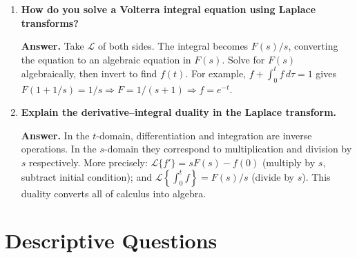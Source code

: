 \documentclass[12pt,a4paper]{article}
\begin{document}
\begin{enumerate}[label=\textbf{Q\arabic*.}, leftmargin=*, itemsep=8pt]
  \textbf{Answer.}
  $\mathcal{L}\!\left\{\int_0^t\!\int_0^{t_1}\!\cdots\!\int_0^{t_{n-1}} f(t_n)\,dt_n\cdots\,dt_1\right\}
  = F(s)/s^n$.
  Derived by applying the single-integral formula $n$ times. At each step the denominator
  gains one more factor of $s$.

\item \textbf{How do you solve a Volterra integral equation using Laplace transforms?}

  \textbf{Answer.} Take $\mathcal{L}$ of both sides. The integral becomes $F(s)/s$,
  converting the equation to an algebraic equation in $F(s)$. Solve for $F(s)$ algebraically,
  then invert to find $f(t)$. For example, $f + \int_0^t f\,d\tau = 1$ gives
  $F(1 + 1/s) = 1/s \Rightarrow F = 1/(s+1) \Rightarrow f = e^{-t}$.

\item \textbf{Explain the derivative--integral duality in the Laplace transform.}

  \textbf{Answer.} In the $t$-domain, differentiation and integration are inverse
  operations. In the $s$-domain they correspond to multiplication and division by $s$
  respectively. More precisely: $\mathcal{L}\{f'\} = sF(s) - f(0)$ (multiply by $s$,
  subtract initial condition); and $\mathcal{L}\!\left\{\int_0^t f\right\} = F(s)/s$
  (divide by $s$). This duality converts all of calculus into algebra.

\end{enumerate}

\section{Descriptive Questions}
\end{document}
